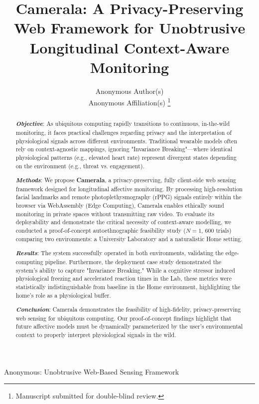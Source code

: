 \documentclass[journal]{IEEEtran}
\begin{document}
\title{Camerala: A Privacy-Preserving Web Framework for Unobtrusive Longitudinal Context-Aware Monitoring}

\author{Anonymous Author(s) \\ Anonymous Affiliation(s)
\thanks{Manuscript submitted for double-blind review.}}

%
{Anonymous: Unobtrusive Web-Based Sensing Framework}

\maketitle

\begin{abstract}
\textbf{\textit{Objective}}: As ubiquitous computing rapidly transitions to continuous, in-the-wild monitoring, it faces practical challenges regarding privacy and the interpretation of physiological signals across different environments. Traditional wearable models often rely on context-agnostic mappings, ignoring "Invariance Breaking"—where identical physiological patterns (e.g., elevated heart rate) represent divergent states depending on the environment (e.g., threat vs. engagement). 

\textbf{\textit{Methods}}: We propose \textbf{Camerala}, a privacy-preserving, fully client-side web sensing framework designed for longitudinal affective monitoring. By processing high-resolution facial landmarks and remote photoplethysmography (rPPG) signals entirely within the browser via WebAssembly (Edge Computing), Camerala enables ethically sound monitoring in private spaces without transmitting raw video. To evaluate its deployability and demonstrate the critical necessity of context-aware modelling, we conducted a proof-of-concept autoethnographic feasibility study ($N=1$, 600 trials) comparing two environments: a University Laboratory and a naturalistic Home setting.

\textbf{\textit{Results}}: The system successfully operated in both environments, validating the edge-computing pipeline. Furthermore, the deployment case study demonstrated the system's ability to capture "Invariance Breaking." While a cognitive stressor induced physiological freezing and accelerated reaction times in the Lab, these metrics were statistically indistinguishable from baseline in the Home environment, highlighting the home's role as a physiological buffer.

\textbf{\textit{Conclusion}}: Camerala demonstrates the feasibility of high-fidelity, privacy-preserving web sensing for ubiquitous computing. Our proof-of-concept findings highlight that future affective models must be dynamically parameterized by the user's environmental context to properly interpret physiological signals in the wild.
\end{abstract}
\end{document}
